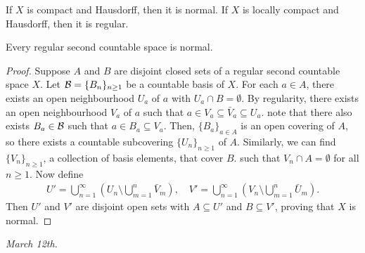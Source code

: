 \begin{theorem}
    If $X$ is compact and Hausdorff, then it is normal. If $X$ is locally compact and Hausdorff, then it is regular.
\end{theorem}

\begin{theorem}
    Every regular second countable space is normal.
\end{theorem}
\begin{proof}
    Suppose $A$ and $B$ are disjoint closed sets of a regular second countable space $X$. Let $\mathcal{B} = \{B_{n}\}_{n \geq 1}$ be a countable basis of $X$. For each $a \in A$, there exists an open neighbourhood $U_{a}$ of $a$ with $U_{a} \cap B = \emptyset$. By regularity, there exists an open neighbourhood $V_{a}$ of $a$ such that $a \in V_{a} \subseteq \bar{V}_{a} \subseteq U_{a}$. note that there also exists $B_{a} \in \mathcal{B}$ such that $a \in B_{a} \subseteq V_{a}$. Then, $\{B_{a}\}_{a \in A}$ is an open covering of $A$, so there exists a countable subcovering $\{U_{n}\}_{n \geq 1}$ of $A$. Similarly, we can find $\{V_{n}\}_{n \geq 1}$, a collection of basis elements, that cover $B$. 
such that $V_{n} \cap A = \emptyset$ for all $n \geq 1$. Now define
\begin{align}
    U' = \bigcup_{n=1}^{\infty} (U_{n} \setminus \bigcup_{m=1}^{n} \bar{V}_{m}), \quad V' = \bigcup_{n=1}^{\infty} (V_{n} \setminus \bigcup_{m=1}^{n} \bar{U}_{m}).
\end{align}
Then $U'$ and $V'$ are disjoint open sets with $A \subseteq U'$ and $B \subseteq V'$, proving that $X$ is normal.
\end{proof}

\textit{March 12th.}

